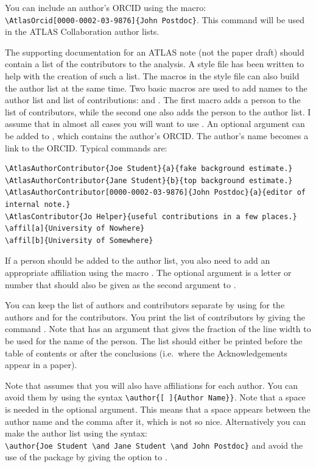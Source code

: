You can include an author's ORCID using the  macro:\\
\verb+\AtlasOrcid[0000-0002-03-9876]{John Postdoc}+.
This command will be used in the ATLAS Collaboration author lists.

The supporting documentation for an ATLAS note (not the paper draft) should contain a list of the contributors to the analysis.
A style file  has been written to help with the creation of such a list.
The macros in the style file can also build the author list at the same time.
Two basic macros are used to add names to the author list and list of contributions:
 and . 
The first macro adds a person to the list of contributors, while the second one also adds the person
to the author list. I assume that in almost all cases you will want to use .
An optional argument can be added to , which contains the author's ORCID.
The author's name becomes a link to the ORCID.
Typical commands are:
\begin{verbatim}
\AtlasAuthorContributor{Joe Student}{a}{fake background estimate.}
\AtlasAuthorContributor{Jane Student}{b}{top background estimate.}
\AtlasAuthorContributor[0000-0002-03-9876]{John Postdoc}{a}{editor of internal note.}
\AtlasContributor{Jo Helper}{useful contributions in a few places.}
\affil[a]{University of Nowhere}
\affil[b]{University of Somewhere}
\end{verbatim}
If a person should be added to the author list, you also need to add an appropriate affiliation using the macro .
The optional argument is a letter or number that should also be given as the second argument to
.

You can keep the list of authors and contributors separate
by using  for the authors and  for the contributors.
You print the list of contributors by giving the command .
Note that  has an argument that gives the fraction of the line width
to be used for the name of the person.
The list should either be printed before the table of contents or after the conclusions
(i.e.\ where the Acknowledgements appear in a paper).

Note that  assumes that you will also have affiliations for each author.
You can avoid them by using the syntax \verb|\author{[ ]{Author Name}}|.
Note that a space is needed in the optional argument.
This means that a space appears between the author name and the comma after it, which is not so nice.
Alternatively you can make the author list using the syntax:\\
\verb|\author{Joe Student \and Jane Student \and John Postdoc}| and avoid the use of the
 package by giving the option  to .

